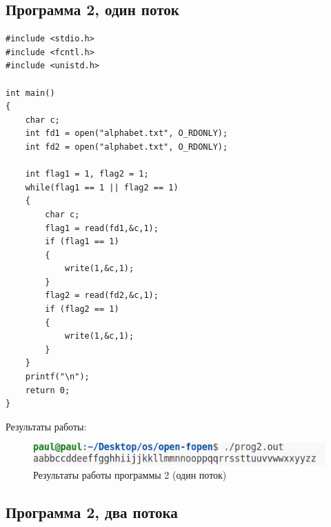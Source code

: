 \clearpage

\subsection*{Программа 2, один поток}

\begin{center}
	\captionsetup{justification=raggedright,singlelinecheck=off}

	\begin{lstlisting}[label=lst:prog2,caption=Программа 2 --- один поток]
#include <stdio.h>
#include <fcntl.h>
#include <unistd.h>

int main()
{
    char c;    
    int fd1 = open("alphabet.txt", O_RDONLY);
    int fd2 = open("alphabet.txt", O_RDONLY);

    int flag1 = 1, flag2 = 1;
    while(flag1 == 1 || flag2 == 1)
    {
        char c;
        flag1 = read(fd1,&c,1);
        if (flag1 == 1) 
        {
            write(1,&c,1);
        }
        flag2 = read(fd2,&c,1);
        if (flag2 == 1) 
        { 
            write(1,&c,1);
        }
    }
    printf("\n");
    return 0;
}
	\end{lstlisting}
\end{center}

Результаты работы:

\begin{figure}[h]
	\centering
	\captionsetup{justification=centering}
	\includegraphics[width=150mm]{img/prog2.png}
	\caption{Результаты работы программы 2 (один поток)}
	\label{fig:prog-2-result}
\end{figure}

\clearpage

\subsection*{Программа 2, два потока}

